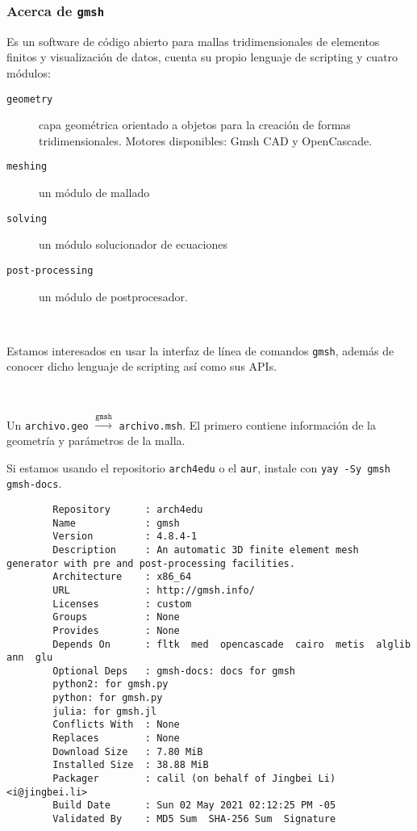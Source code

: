 




\begin{frame}[fragile]
	\frametitle{Acerca de \texttt{gmsh}}
	Es un software de código abierto para mallas tridimensionales de elementos
	finitos y visualización de datos, cuenta su propio lenguaje de scripting y cuatro módulos:

	\begin{description}
		\item[\texttt{geometry}]

			capa geométrica orientado a objetos para la creación de formas tridimensionales. Motores disponibles: Gmsh CAD y OpenCascade.

		\item[\texttt{meshing}]

			un módulo de mallado

		\item[\texttt{solving}]

			un módulo solucionador de ecuaciones

		\item[\texttt{post-processing}]

			un módulo de postprocesador.
	\end{description}

	\

	Estamos interesados en usar la interfaz de línea de comandos
	\verb|gmsh|, además de conocer dicho lenguaje de scripting así como
	sus APIs.

	\

	Un \verb|archivo.geo| $\stackrel{\texttt{gmsh}}{\longrightarrow}$ \verb|archivo.msh|.
	El primero contiene información de la geometría y parámetros de la malla.
\end{frame}

\begin{frame}[fragile]
	Si estamos usando el repositorio \verb|arch4edu| o el \verb|aur|, instale con \verb|yay -Sy gmsh gmsh-docs|.\scriptsize
	\begin{verbatim}
		Repository      : arch4edu
		Name            : gmsh
		Version         : 4.8.4-1
		Description     : An automatic 3D finite element mesh generator with pre and post-processing facilities.
		Architecture    : x86_64
		URL             : http://gmsh.info/
		Licenses        : custom
		Groups          : None
		Provides        : None
		Depends On      : fltk  med  opencascade  cairo  metis  alglib  ann  glu
		Optional Deps   : gmsh-docs: docs for gmsh
		python2: for gmsh.py
		python: for gmsh.py
		julia: for gmsh.jl
		Conflicts With  : None
		Replaces        : None
		Download Size   : 7.80 MiB
		Installed Size  : 38.88 MiB
		Packager        : calil (on behalf of Jingbei Li) <i@jingbei.li>
		Build Date      : Sun 02 May 2021 02:12:25 PM -05
		Validated By    : MD5 Sum  SHA-256 Sum  Signature
	\end{verbatim}
\end{frame}

